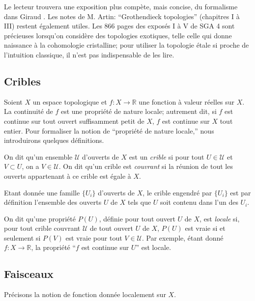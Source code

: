 \documentclass{book}
\newcommand{\dR}{\mathbb{R}}
\newcommand{\sU}{\mathscr{U}}
\begin{document}
Le lecteur trouvera une exposition plus compète, mais concise, du 
formalisme dans Giraud \cite{Gi}. Les notes de M. Artin: ``Grothendieck 
topologies'' \cite{Ar} (chapitres I à III) restent également utiles. Les 
866 pages des exposés I à V de SGA 4 sont précieuses lorsqu'on 
considère des topologies exotiques, telle celle qui donne naissance à la 
cohomologie cristalline; pour utiliser la topologie étale si proche de 
l'intuition classique, il n'est pas indispensable de les lire. 










\subsection{Cribles}\label{I:1-1}

Soient $X$ un espace topologique et $f:X\to \dR$ une fonction à valeur 
réelles sur $X$. La continuité de $f$ est une propriété de nature 
locale; autrement dit, si $f$ est continue sur tout ouvert suffisamment petit 
de $X$, $f$ est continue sur $X$ tout entier. Pour formaliser la notion de 
``propriété de nature locale,'' nous introduirons quelques définitions.

On dit qu'un ensemble $\sU$ d'ouverts de $X$ est un \emph{crible} si pour tout 
$U\in\sU$ et $V\subset U$, on a $V\in\sU$. On dit qu'un crible est 
\emph{couvrant} si la réunion de tout les ouverts appartenant à ce crible est 
égale à $X$.

Etant donnée une famille $\{U_i\}$ d'ouverts de $X$, le crible engendré par 
$\{U_i\}$ est par définition l'ensemble des ouverts $U$ de $X$ tels que $U$ 
soit contenu dans l'un des $U_i$. 

On dit qu'une propriété $P(U)$, définie pour tout ouvert $U$ de $X$, est 
\emph{locale} si, pour tout crible couvrant $\sU$ de tout ouvert $U$ de $X$, 
$P(U)$ est vraie si et seulement si $P(V)$ est vraie pour tout $V\in \sU$. Par 
exemple, étant donné $f:X\to \dR$, la propriété ``$f$ est continue sur $U$'' 
est locale. 





\subsection{Faisceaux}\label{I:1-2}

Précisons la notion de fonction donnée localement sur $X$.
\end{document}
